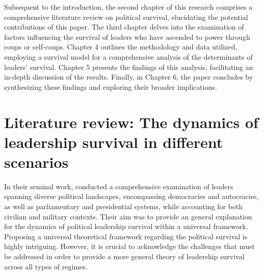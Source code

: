 \documentclass[
  12pt,
  a4paper,
  12pt]{article}
\begin{document}
Subsequent to the introduction, the second chapter of this research
comprises a comprehensive literature review on political survival,
elucidating the potential contributions of this paper. The third chapter
delves into the examination of factors influencing the survival of
leaders who have ascended to power through coups or self-coups. Chapter
4 outlines the methodology and data utilized, employing a survival model
for a comprehensive analysis of the determinants of leaders' survival.
Chapter 5 presents the findings of this analysis, facilitating an
in-depth discussion of the results. Finally, in Chapter 6, the paper
concludes by synthesizing these findings and exploring their broader
implications.

\newpage

\section{Literature review: The dynamics of leadership survival in
different
scenarios}\label{literature-review-the-dynamics-of-leadership-survival-in-different-scenarios}

In their seminal work, \citet{buenodemesquita2003} conducted a
comprehensive examination of leaders spanning diverse political
landscapes, encompassing democracies and autocracies, as well as
parliamentary and presidential systems, while accounting for both
civilian and military contexts. Their aim was to provide an general
explanation for the dynamics of political leadership survival within a
universal framework. Proposing a universal theoretical framework
regarding the political survival is highly intriguing. However, it is
crucial to acknowledge the challenges that must be addressed in order to
provide a more general theory of leadership survival across all types of
regimes.
\end{document}
